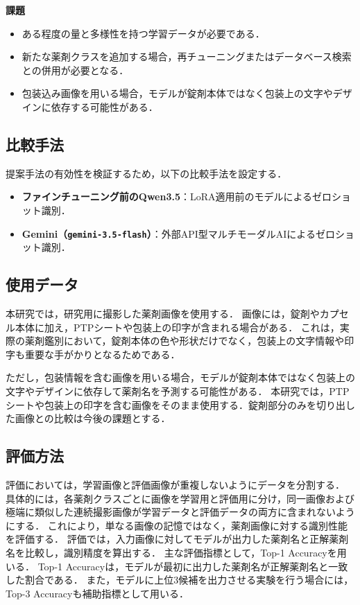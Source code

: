 \documentclass{jsarticle}
\begin{document}
\textbf{課題}
\begin{itemize}
  \item ある程度の量と多様性を持つ学習データが必要である．
  \item 新たな薬剤クラスを追加する場合，再チューニングまたはデータベース検索との併用が必要となる．
  \item 包装込み画像を用いる場合，モデルが錠剤本体ではなく包装上の文字やデザインに依存する可能性がある．
\end{itemize}

\subsection{比較手法}

提案手法の有効性を検証するため，以下の比較手法を設定する．

\begin{itemize}
  \item \textbf{ファインチューニング前のQwen3.5}：LoRA適用前のモデルによるゼロショット識別．
  \item \textbf{Gemini（\texttt{gemini-3.5-flash}）}：外部API型マルチモーダルAIによるゼロショット識別．
\end{itemize}

\subsection{使用データ}

本研究では，研究用に撮影した薬剤画像を使用する．
画像には，錠剤やカプセル本体に加え，PTPシートや包装上の印字が含まれる場合がある．
これは，実際の薬剤鑑別において，錠剤本体の色や形状だけでなく，包装上の文字情報や印字も重要な手がかりとなるためである．

ただし，包装情報を含む画像を用いる場合，モデルが錠剤本体ではなく包装上の文字やデザインに依存して薬剤名を予測する可能性がある．
本研究では，PTPシートや包装上の印字を含む画像をそのまま使用する．錠剤部分のみを切り出した画像との比較は今後の課題とする．

\subsection{評価方法}

評価においては，学習画像と評価画像が重複しないようにデータを分割する．
具体的には，各薬剤クラスごとに画像を学習用と評価用に分け，同一画像および極端に類似した連続撮影画像が学習データと評価データの両方に含まれないようにする．
これにより，単なる画像の記憶ではなく，薬剤画像に対する識別性能を評価する．
評価では，入力画像に対してモデルが出力した薬剤名と正解薬剤名を比較し，識別精度を算出する．
主な評価指標として，Top-1 Accuracyを用いる．
Top-1 Accuracyは，モデルが最初に出力した薬剤名が正解薬剤名と一致した割合である．
また，モデルに上位3候補を出力させる実験を行う場合には，Top-3 Accuracyも補助指標として用いる．
\end{document}

